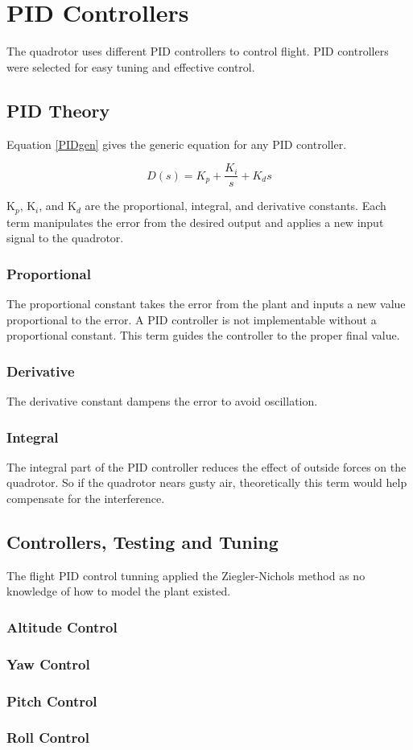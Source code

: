 
\section{PID Controllers}


The quadrotor uses different PID controllers to control flight. PID controllers were selected for easy tuning and effective control. 

\subsection{PID Theory}
Equation \ref{PIDgen} gives the generic equation for any PID controller. 

\begin{equation}
D(s) = K_p+\frac{K_i}{s}+K_ds
\label{PIDgen}
\end{equation}

K$_p$, K$_i$, and K$_d$ are the proportional, integral, and derivative constants.  Each term manipulates the error from the desired output and applies a new input signal to the quadrotor. 

\subsubsection{Proportional}
The proportional constant takes the error from the plant and inputs a new value proportional to the error. A PID controller is not implementable without a proportional constant.  This term guides the controller to the proper final value. 

\subsubsection{Derivative}
The derivative constant dampens the error to avoid oscillation. 

\subsubsection{Integral}
The integral part of the PID controller reduces the effect of outside forces on the quadrotor.  So if the quadrotor nears gusty air, theoretically this term would help compensate for the interference. 

\subsection{Controllers, Testing and Tuning}

The flight  PID control tunning applied the Ziegler-Nichols method as no knowledge of how to model the plant existed.
\subsubsection{Altitude Control}
\subsubsection{Yaw Control}
\subsubsection{Pitch Control}
\subsubsection{Roll Control}